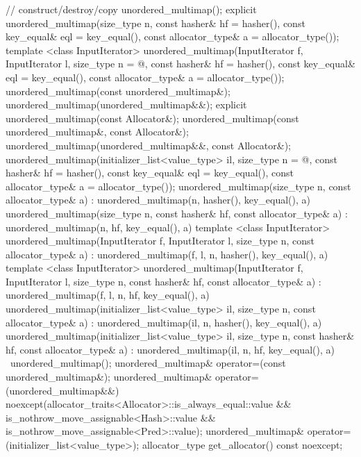\begin{codeblock}
{{    // construct/destroy/copy
    unordered_multimap();
    explicit unordered_multimap(size_type n,
                                const hasher& hf = hasher(),
                                const key_equal& eql = key_equal(),
                                const allocator_type& a = allocator_type());
    template <class InputIterator>
      unordered_multimap(InputIterator f, InputIterator l,
                         size_type n = @\seebelow@,
                         const hasher& hf = hasher(),
                         const key_equal& eql = key_equal(),
                         const allocator_type& a = allocator_type());
    unordered_multimap(const unordered_multimap&);
    unordered_multimap(unordered_multimap&&);
    explicit unordered_multimap(const Allocator&);
    unordered_multimap(const unordered_multimap&, const Allocator&);
    unordered_multimap(unordered_multimap&&, const Allocator&);
    unordered_multimap(initializer_list<value_type> il,
                       size_type n = @\seebelow@,
                       const hasher& hf = hasher(),
                       const key_equal& eql = key_equal(),
                       const allocator_type& a = allocator_type());
    unordered_multimap(size_type n, const allocator_type& a)
      : unordered_multimap(n, hasher(), key_equal(), a) { }
    unordered_multimap(size_type n, const hasher& hf, const allocator_type& a)
      : unordered_multimap(n, hf, key_equal(), a) { }
    template <class InputIterator>
      unordered_multimap(InputIterator f, InputIterator l, size_type n, const allocator_type& a)
        : unordered_multimap(f, l, n, hasher(), key_equal(), a) { }
    template <class InputIterator>
      unordered_multimap(InputIterator f, InputIterator l, size_type n, const hasher& hf, 
                         const allocator_type& a)
        : unordered_multimap(f, l, n, hf, key_equal(), a) { }
    unordered_multimap(initializer_list<value_type> il, size_type n, const allocator_type& a)
      : unordered_multimap(il, n, hasher(), key_equal(), a) { }
    unordered_multimap(initializer_list<value_type> il, size_type n, const hasher& hf, 
                       const allocator_type& a)
      : unordered_multimap(il, n, hf, key_equal(), a) { }
    ~unordered_multimap();
    unordered_multimap& operator=(const unordered_multimap&);
    unordered_multimap& operator=(unordered_multimap&&)
      noexcept(allocator_traits<Allocator>::is_always_equal::value &&
               is_nothrow_move_assignable<Hash>::value &&
               is_nothrow_move_assignable<Pred>::value);
    unordered_multimap& operator=(initializer_list<value_type>);
    allocator_type get_allocator() const noexcept;

}}
\end{codeblock}
